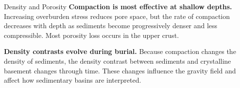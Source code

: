 \begin{activity}{Density and Porosity}
\textbf{Compaction is most effective at shallow depths.}
Increasing overburden stress reduces pore space, but the rate of compaction decreases with depth as sediments become progressively denser and less compressible. Most porosity loss occurs in the upper crust.

\textbf{Density contrasts evolve during burial.}
Because compaction changes the density of sediments, the density contrast between sediments and crystalline basement changes through time. These changes influence the gravity field and affect how sedimentary basins are interpreted.

\end{activity}